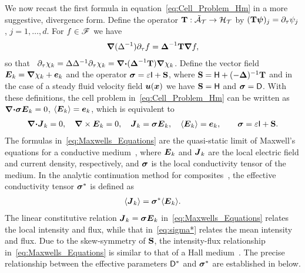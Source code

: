 \documentclass[amsa]{ipart}
\begin{document}
We now recast the first formula in equation~\eqref{eq:Cell_Problem_Hm}
in a more suggestive, divergence form. Define the operator
$\mathbf{T}:\tilde{\mathcal{A}}_{\mathcal{T}}\to\mathcal{H}_{\mathcal{T}}$ by $(\mathbf{T}\boldsymbol{\psi})_j=\partial_\tau\psi_j$,
$j=1,\ldots,d$. For $f\in\mathscr{F}$ we
have~\cite{Fannjiang:1994:SIAM_JAM:333,Folland:99:RealAnalysis,Folland:95:PDEs}     
%
\begin{align}\label{eq:Dt_T}
  \bnabla(\Delta^{-1})\partial_\tau f=\bDelta^{-1}\Tb\bnabla f ,
\end{align}
%
so that~\cite{Fannjiang:1994:SIAM_JAM:333}
$\partial_\tau\chi_k=\Delta\Delta^{-1}\partial_\tau\chi_k=\mbox{\boldmath${\nabla}$} \mbox{\boldmath${\cdot}$}(\mbox{\boldmath${\Delta}$}^{-1}\mathbf{T})\mbox{\boldmath${\nabla}$} \chi_k$. Define the  
vector field $\boldsymbol{E}_k=\mbox{\boldmath${\nabla}$} \chi_k+\boldsymbol{e}_k$ and the operator
$\mbox{\boldmath${\sigma}$}=\varepsilon\mathsf{I}+\mathbf{S}$, where
$\mathbf{S}=\mathsf{H}+(-\mbox{\boldmath${\Delta}$})^{-1}\mathbf{T}$ and in the case of a steady fluid velocity
field $\boldsymbol{u}(\boldsymbol{x})$ we have $\mathbf{S}=\mathsf{H}$ and $\mbox{\boldmath${\sigma}$}=\mathsf{D}$. With these
definitions, the cell problem in~\eqref{eq:Cell_Problem_Hm} can be
written as $\mbox{\boldmath${\nabla}$}\mbox{\boldmath${\cdot}$}\mbox{\boldmath${\sigma}$}\boldsymbol{E}_k=0$, $\langle\boldsymbol{E}_k\rangle=\boldsymbol{e}_k$, which
is equivalent to     
%
\begin{align}\label{eq:Maxwells_Equations}    
  \bnabla \bcdot\vecJ_k=0, \quad
  \bnabla \times\vecE_k=0, \quad
  \vecJ_k=\bsig\vecE_k,\quad
  \langle\vecE_k\rangle=\vece _k,\qquad
  \bsig%
       =\varepsilon\Ib+\Sb.
\end{align}
%
The formulas in~\eqref{eq:Maxwells_Equations} are the
quasi-static limit of Maxwell's equations for a conductive
medium~\cite{Golden:CMP-473,MILTON:2002:TC}, where $\boldsymbol{E}_k$ and
$\boldsymbol{J}_k$ are the local electric field and current density,
respectively, and $\mbox{\boldmath${\sigma}$}$ is the local conductivity tensor of the
medium. In the analytic continuation method for
composites~\cite{Golden:CMP-473,Milton:APL-300,Bergman:PRC-377}, the
effective conductivity tensor $\mbox{\boldmath${\sigma}$}^*$ is defined as 
% 
\begin{align}\label{eq:sigma*}
  \langle\vecJ_k\rangle=\bsig^*\langle\vecE_k\rangle.
\end{align}
%
The linear constitutive relation $\boldsymbol{J}_k=\mbox{\boldmath${\sigma}$}\boldsymbol{E}_k$
in~\eqref{eq:Maxwells_Equations} relates the local intensity and flux, 
while that in~\eqref{eq:sigma*} relates the mean intensity and
flux. Due to the skew-symmetry of $\mathbf{S}$, the intensity-flux
relationship in~\eqref{eq:Maxwells_Equations} is similar to that of a
Hall
medium~\cite{Isichenko:JNS:1991:375,Fannjiang:1994:SIAM_JAM:333}. The
precise relationship between the effective parameters $\mathsf{D}^*$ 
and $\mbox{\boldmath${\sigma}$}^*$ are established in  below.
\end{document}
